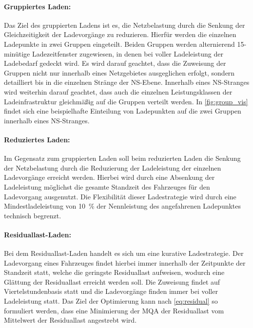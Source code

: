 \paragraph{Gruppiertes Laden:}

Das Ziel des gruppierten Ladens ist es, die Netzbelastung durch die Senkung der Gleichzeitigkeit der Ladevorgänge zu reduzieren.
Hierfür werden die einzelnen Ladepunkte in zwei Gruppen eingeteilt.
Beiden Gruppen werden alternierend 15-minütige Ladezeitfenster zugewiesen, in denen bei voller Ladeleistung der Ladebedarf gedeckt wird.
Es wird darauf geachtet, dass die Zuweisung der Gruppen nicht nur innerhalb eines Netzgebietes ausgeglichen erfolgt, sondern detailliert bis in die einzelnen Stränge der \gls{NS}-Ebene.
Innerhalb eines \gls{NS}-Stranges wird weiterhin darauf geachtet, dass auch die einzelnen Leistungsklassen der Ladeinfrastruktur gleichmäßig auf die Gruppen verteilt werden.
In \autoref{fig:group_vis} findet sich eine beispielhafte Einteilung von Ladepunkten auf die zwei Gruppen innerhalb eines \gls{NS}-Stranges.




\paragraph{Reduziertes Laden:}

Im Gegensatz zum gruppierten Laden soll beim reduzierten Laden die Senkung der Netzbelastung durch die Reduzierung der Ladeleistung der einzelnen Ladevorgänge erreicht werden.
Hierbei wird durch eine Absenkung der Ladeleistung möglichst die gesamte Standzeit des Fahrzeuges für den Ladevorgang ausgenutzt.
Die Flexibilität dieser Ladestrategie wird durch eine Mindestladeleistung von \SI{10}{\percent} der Nennleistung des angefahrenen Ladepunktes technisch begrenzt.



\paragraph{Residuallast-Laden:}

Bei dem Residuallast-Laden handelt es sich um eine kurative Ladestrategie.
Der Ladevorgang eines Fahrzeuges findet hierbei immer innerhalb der Zeitpunkte der Standzeit statt, welche die geringste Residuallast aufweisen, wodurch eine Glättung der Residuallast erreicht werden soll.
Die Zuweisung findet auf Viertelstundenbasis statt und die Ladevorgänge finden immer bei voller Ladeleistung statt.
Das Ziel der Optimierung kann nach \autoref{eq:residual} so formuliert werden, dass eine Minimierung der \gls{MQA} der Residuallast vom Mittelwert der Residuallast angestrebt wird.

